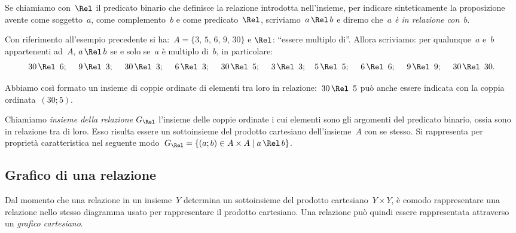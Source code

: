 \ovalbox{\risolvi \ref{ese:B.2}}

Se chiamiamo con~$\Rel$ il predicato binario che definisce la relazione introdotta nell'insieme, per indicare 
sinteticamente la proposizione avente come soggetto~$a$, come complemento~$b$ e come predicato~$\Rel$, scriviamo~$a \,\Rel\, b$ e
diremo che~\emph{$a$ è in relazione con~$b$}.

\begin{exrig}
 \begin{esempio}

Con riferimento all'esempio precedente si ha:~$A = \{3\text{,~}5\text{,~}6\text{,~}9\text{,~}30\}$ e $\Rel$:
``essere multiplo di''. Allora scriviamo: per qualunque~$a$ e~$b$ appartenenti ad~$A$,
$a \,\Rel\, b$ se e solo se~$a$ è multiplo di~$b$, in particolare:
\[30 \,\Rel\,~6;\quad~9 \,\Rel\,~3;\quad~30 \,\Rel\,~3;\quad~6 \,\Rel\,~3;\quad~30 \,\Rel\,~5;\quad~3 \,\Rel\,~3;\quad 5 \,\Rel\,~5;\quad~6 \,\Rel\,~6;\quad~9 \,\Rel\,~9;\quad~30 \,\Rel\,~30.\]
\end{esempio}
\end{exrig}

Abbiamo così formato un insieme di coppie ordinate di elementi tra loro in relazione:~$30 \,\Rel\,~5$ può anche essere indicata con la coppia ordinata~$(30;5)$.

\begin{definizione}
Chiamiamo \emph{insieme della relazione} $G_\Rel$ l'insieme delle coppie ordinate i cui
elementi sono gli argomenti del predicato binario, ossia sono in relazione tra di loro. Esso risulta essere un
sottoinsieme del prodotto cartesiano dell'insieme~$A$ con se stesso. Si rappresenta per proprietà caratteristica nel
seguente modo~$G_\Rel = \{(a;b) \in A \times A \mid  a \,\Rel\, b \}$.
\end{definizione}

\ovalbox{\risolvii \ref{ese:B.3}, \ref{ese:B.4}, \ref{ese:B.5}, \ref{ese:B.6}}
\subsection{Grafico di una relazione}

Dal momento che una relazione in un insieme~$Y$ determina un sottoinsieme del prodotto cartesiano~$Y \times Y$, è
comodo rappresentare una relazione nello stesso diagramma usato per rappresentare il prodotto cartesiano.
Una relazione può quindi essere rappresentata attraverso un \emph{grafico cartesiano}.


